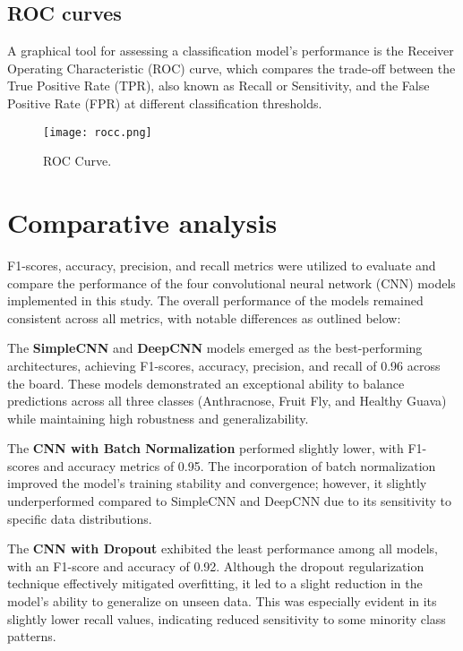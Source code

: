 \documentclass[conference]{IEEEtran}
\begin{document}
\subsection{ROC curves}

A graphical tool for assessing a classification model's performance is the Receiver Operating Characteristic (ROC) curve, which compares the trade-off between the True Positive Rate (TPR), also known as Recall or Sensitivity, and the False Positive Rate (FPR) at different classification thresholds.

\begin{figure}[h]
  \centering
  \texttt{[image: rocc.png]}
  \caption{ROC Curve.}
  \label{fig:your_label}
\end{figure}


\section*{Comparative analysis}

F1-scores, accuracy, precision, and recall metrics were utilized to evaluate and compare the performance of the four convolutional neural network (CNN) models implemented in this study. The overall performance of the models remained consistent across all metrics, with notable differences as outlined below:

The \textbf{SimpleCNN} and \textbf{DeepCNN} models emerged as the best-performing architectures, achieving F1-scores, accuracy, precision, and recall of 0.96 across the board. These models demonstrated an exceptional ability to balance predictions across all three classes (Anthracnose, Fruit Fly, and Healthy Guava) while maintaining high robustness and generalizability.

The \textbf{CNN with Batch Normalization} performed slightly lower, with F1-scores and accuracy metrics of 0.95. The incorporation of batch normalization improved the model's training stability and convergence; however, it slightly underperformed compared to SimpleCNN and DeepCNN due to its sensitivity to specific data distributions.

The \textbf{CNN with Dropout} exhibited the least performance among all models, with an F1-score and accuracy of 0.92. Although the dropout regularization technique effectively mitigated overfitting, it led to a slight reduction in the model's ability to generalize on unseen data. This was especially evident in its slightly lower recall values, indicating reduced sensitivity to some minority class patterns.
\end{document}
